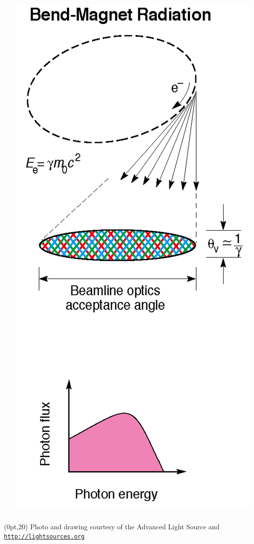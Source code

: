 \documentclass[10pt, xcolor=x11names, compress]{beamer}
\begin{document}
\begin{frame}
\begin{columns}
\begin{column}{0.65\linewidth}
    \end{column}
    \begin{column}{0.35\linewidth}
      \begin{center}
        \includegraphics[width=0.9\linewidth]{synch/bend.png}
      \end{center}
    \end{column}
  \end{columns}
  \begin{textblock*}{0.7\linewidth}(0pt,20\TPVertModule)%
    \tiny%
    Photo and drawing courtesy of the Advanced Light Source
    and \href{http://lightsources.org}%
    {\color{Brown4}\texttt{http://lightsources.org}}
  \end{textblock*}
\end{frame}
\end{document}

